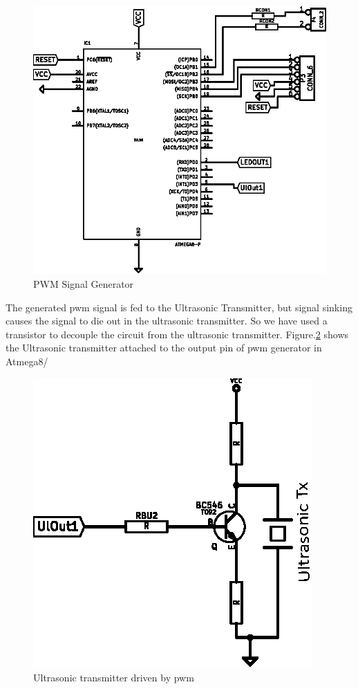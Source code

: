 \begin{figure}
	\centering
	\includegraphics{Images/PWMGenerator.eps}
	\caption{PWM Signal Generator}
	\label{fig:PWMGenerator}
\end{figure}

The generated \gls{pwm} signal is fed to the Ultrasonic Transmitter, but signal sinking causes the signal to die out in the ultrasonic transmitter. So we have used a transistor to decouple the circuit from the ultrasonic transmitter. Figure.\ref{fig:Transmitter} shows the Ultrasonic transmitter attached to the output pin of \gls{pwm} generator in Atmega8/
\begin{figure}
	\centering
	\includegraphics{Images/Transmitter.eps}
	\caption{Ultrasonic transmitter driven by \gls{pwm}}
	\label{fig:Transmitter}
\end{figure}


